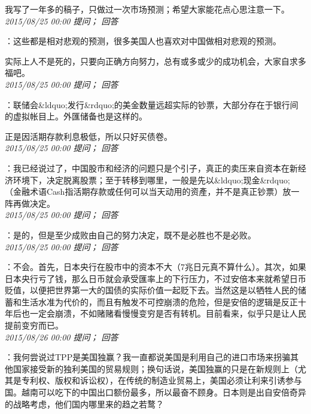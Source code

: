 \documentclass[twocolumn]{ctexart}
\begin{document}
我写了一年多的稿子，只做过一次市场预测；希望大家能花点心思注意一下。\\

\textit{\hfill\noindent\small 2015/08/25 00:00 提问； 回答}

：这些都是相对悲观的预测，很多美国人也喜欢对中国做相对悲观的预测。

实际上人不是死的，只要向正确方向努力，总有或多或少的成功机会，大家自求多福吧。\\

\textit{\hfill\noindent\small 2015/08/25 00:00 提问； 回答}

：联储会\&ldquo;发行\&rdquo;的美金数量远超实际的钞票，大部分存在于银行间的虚拟帐目上。外匯储备也是这样的。

正是因活期存款利息极低，所以只好买债卷。\\

\textit{\hfill\noindent\small 2015/08/25 00:00 提问； 回答}

：我已经说过了，中国股市和经济的问题只是个引子，真正的卖压来自资本在新经济环境下，决定脱离股票；至于转移到哪里，一般是先以\&ldquo;现金\&rdquo;（金融术语Cash指活期存款或任何可以当天动用的资產，并不是真正钞票）放一阵再做决定。\\

\textit{\hfill\noindent\small 2015/08/25 00:00 提问； 回答}

：是的，但是至少成败由自己的努力决定，既不是必胜也不是必败。\\

\textit{\hfill\noindent\small 2015/08/25 00:00 提问； 回答}

：不会。首先，日本央行在股市中的资本不大（7兆日元真不算什么）。其次，如果日本央行亏了钱，那么日币就会承受匯率上的下行压力，不过安倍本来就希望日币贬值，以便把世界第一大的国债的实际价值一起贬下去。当然这是以牺牲人民的储蓄和生活水准为代价的，而且有触发不可控崩溃的危险，但是安倍的逻辑是反正十年后也一定会崩溃，不如赌赌看慢慢变穷是否有转机。目前看来，似乎只是让人民提前变穷而已。\\

\textit{\hfill\noindent\small 2015/08/26 00:00 提问； 回答}

：我何尝说过TPP是美国独赢？我一直都说美国是利用自己的进口市场来拐骗其他国家接受新的独利美国的贸易规则；换句话说，美国独赢的只是在新规则上（尤其是专利权、版权和诉讼权），在传统的制造业贸易上，美国必须让利来引诱参与国。越南可以吃下的中国出口额份最多，所以最奋不顾身。日本则是出自安倍奇异的战略考虑，他们国内哪里来的趋之若鹜？
\end{document}
